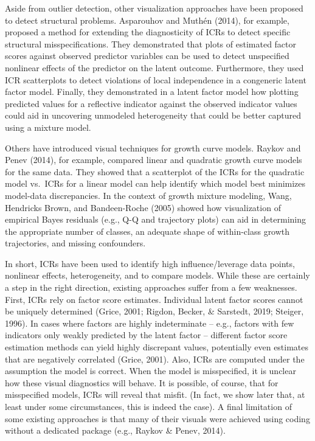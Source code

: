 \documentclass[
  english,
  man]{apa6}
\begin{document}
Aside from outlier detection, other visualization approaches have been proposed to detect structural problems. Asparouhov and Muthén (2014), for example, proposed a method for extending the diagnosticity of ICRs to detect specific structural misspecifications. They demonstrated that plots of estimated factor scores against observed predictor variables can be used to detect unspecified nonlinear effects of the predictor on the latent outcome. Furthermore, they used ICR scatterplots to detect violations of local independence in a congeneric latent factor model. Finally, they demonstrated in a latent factor model how plotting predicted values for a reflective indicator against the observed indicator values could aid in uncovering unmodeled heterogeneity that could be better captured using a mixture model.

Others have introduced visual techniques for growth curve models. Raykov and Penev (2014), for example, compared linear and quadratic growth curve models for the same data. They showed that a scatterplot of the ICRs for the quadratic model vs.~ICRs for a linear model can help identify which model best minimizes model-data discrepancies. In the context of growth mixture modeling, Wang, Hendricks Brown, and Bandeen-Roche (2005) showed how visualization of empirical Bayes residuals (e.g., Q-Q and trajectory plots) can aid in determining the appropriate number of classes, an adequate shape of within-class growth trajectories, and missing confounders.

In short, ICRs have been used to identify high influence/leverage data points, nonlinear effects, heterogeneity, and to compare models. While these are certainly a step in the right direction, existing approaches suffer from a few weaknesses. First, ICRs rely on factor score estimates. Individual latent factor scores cannot be uniquely determined (Grice, 2001; Rigdon, Becker, \& Sarstedt, 2019; Steiger, 1996). In cases where factors are highly indeterminate -- e.g., factors with few indicators only weakly predicted by the latent factor -- different factor score estimation methods can yield highly discrepant values, potentially even estimates that are negatively correlated (Grice, 2001). Also, ICRs are computed under the assumption the model is correct. When the model is misspecified, it is unclear how these visual diagnostics will behave. It is possible, of course, that for misspecified models, ICRs will reveal that misfit. (In fact, we show later that, at least under some circumstances, this is indeed the case). A final limitation of some existing approaches is that many of their visuals were achieved using coding without a dedicated package (e.g., Raykov \& Penev, 2014).
\end{document}
